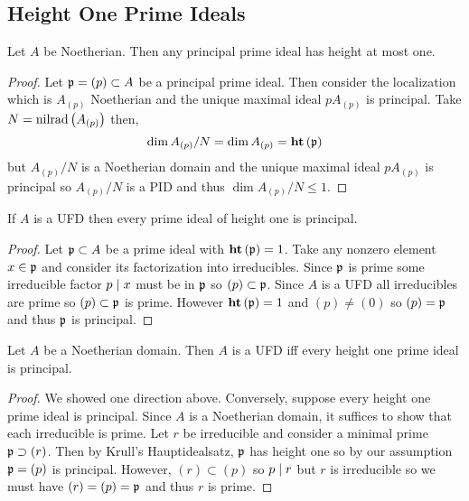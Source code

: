 \documentclass[12pt]{article}
\begin{document}
\subsection{Height One Prime Ideals}

\begin{proposition}
Let $A$ be Noetherian. Then any principal prime ideal has height at most one.
\end{proposition}

\begin{proof}
Let $\mathfrak{p} = (p) \subset A$ be a principal prime ideal. Then consider the localization which is $A_{(p)}$ Noetherian and the unique maximal ideal $p A_{(p)}$ is principal. Take $N = \mathrm{nilrad}\left( A_{(p)} \right)$ then,
\[ \dim{A_{(p)}/N} = \dim{A_{(p)}} = \mathbf{ht}\left( \mathfrak{p} \right) \]
but $A_{(p)} / N$ is a Noetherian domain and the unique maximal ideal $p A_{(p)}$ is principal so $A_{(p)} / N$ is a PID and thus $\dim{A_{(p)} / N} \le 1$. 
\end{proof}

\begin{proposition}
If $A$ is a UFD then every prime ideal of height one is principal.
\end{proposition}

\begin{proof}
Let $\mathfrak{p} \subset A$ be a prime ideal with $\mathbf{ht}\left( \mathfrak{p} \right) = 1$. Take any nonzero element $x \in \mathfrak{p}$ and consider its factorization into irreducibles. Since $\mathfrak{p}$ is prime some irreducible factor $p \mid x$ must be in $\mathfrak{p}$ so $(p) \subset \mathfrak{p}$. Since $A$ is a UFD all irreducibles are prime so $(p) \subset \mathfrak{p}$ is prime. However $\mathbf{ht}\left( \mathfrak{p} \right) = 1$ and $(p) \neq (0)$ so $(p) = \mathfrak{p}$ and thus $\mathfrak{p}$ is principal.
\end{proof}

\begin{theorem}
Let $A$ be a Noetherian domain. Then $A$ is a UFD iff every height one prime ideal is principal. 
\end{theorem}

\begin{proof}
We showed one direction above. Conversely, suppose every height one prime ideal is principal. Since $A$ is a Noetherian domain, it suffices to show that each irreducible is prime. Let $r$ be irreducible and consider a minimal prime $\mathfrak{p} \supset (r)$. Then by Krull's Hauptidealsatz, $\mathfrak{p}$ has height one so by our assumption $\mathfrak{p} = (p)$ is principal. However, $(r) \subset (p)$ so $p \mid r$ but $r$ is irreducible so we must have $(r) = (p) = \mathfrak{p}$ and thus $r$ is prime.
\end{proof}
\end{document}
